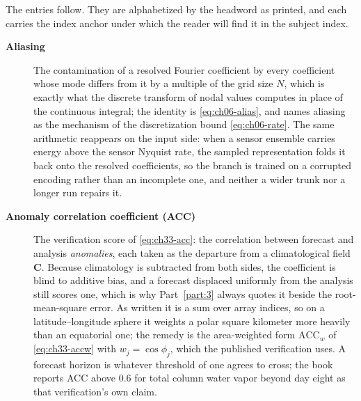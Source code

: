 The entries follow. They are alphabetized by the headword as printed, and each
carries the index anchor under which the reader will find it in the subject index.

\begin{description}

\item[\textbf{Aliasing}] The contamination of a resolved Fourier coefficient by
every coefficient whose mode differs from it by a multiple of the grid size $N$,
which is exactly what the discrete transform of nodal values computes in place of
the continuous integral; the identity is \eqref{eq:ch06-alias}, and
 names aliasing as the
mechanism of the discretization bound \eqref{eq:ch06-rate}. The same arithmetic
reappears on the input side: when a sensor ensemble carries energy above the
sensor Nyquist rate, the sampled representation folds it back onto the resolved
coefficients, so the branch is trained on a corrupted encoding rather than an
incomplete one, and neither a wider trunk nor a longer run repairs it.

\item[\textbf{Anomaly correlation coefficient (ACC)}] The verification score of
\eqref{eq:ch33-acc}: the correlation between forecast and analysis \emph{anomalies},
each taken as the departure from a climatological field $\mathbf{C}$. Because
climatology is subtracted from both sides, the coefficient is blind to additive
bias, and a forecast displaced uniformly from the analysis still scores one, which
is why Part~\ref{part:3} always quotes it beside the root-mean-square error. As
written it is a sum over array indices, so on a latitude--longitude sphere it
weights a polar square kilometer more heavily than an equatorial one; the remedy is
the area-weighted form $\mathrm{ACC}_{w}$ of \eqref{eq:ch33-accw} with $w_j =
\cos\phi_j$, which the published verification uses. A forecast horizon is whatever
threshold of one agrees to cross; the book reports ACC above $0.6$ for total column
water vapor beyond day eight as that verification's own claim.


\end{description}
